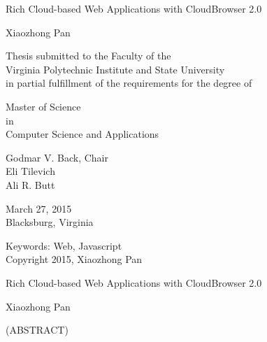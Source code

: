 \documentclass[12pt,dvips]{report}
\begin{document}
\newcommand{\cb}{CloudBrowser\xspace}
\newcommand{\projectname}{CloudBrowser\xspace}
\newcommand{\cbtwo}{CloudBrowser 2.0\xspace}
\newcommand{\js}{JavaScript\xspace}
\newcommand{\nodejs}{Node.js\xspace}
\newcommand{\appins}{App Instance\xspace}
\newcommand{\jsdom}{JSDOM\xspace}
\newcommand{\citemain}{~\cite{mcdaniel2012cloudbrowser}}
\newcommand{\etdtitle}{Rich Cloud-based Web Applications with \cbtwo}

\def\code#1{\texttt{#1}}
\def\nodermi{\texttt{nodermi\xspace}}

\thispagestyle{empty}
\begin{center}

{\Large 
\etdtitle{}
}

\vfill

Xiaozhong Pan

\vfill

Thesis submitted to the Faculty of the \\
Virginia Polytechnic Institute and State University \\
in partial fulfillment of the requirements for the degree of

\vfill

Master of Science \\
in \\
Computer Science and Applications

\vfill

Godmar V. Back, Chair \\
Eli Tilevich\\
Ali R. Butt

\vfill

March 27, 2015 \\
Blacksburg, Virginia

\vfill

Keywords: Web, Javascript
\\
Copyright 2015, Xiaozhong Pan

\end{center}

\pagebreak

\thispagestyle{empty}
\begin{center}

{\large \etdtitle{}}

\vfill

Xiaozhong Pan

\vfill

(ABSTRACT)

\vfill

\end{center}
\end{document}
